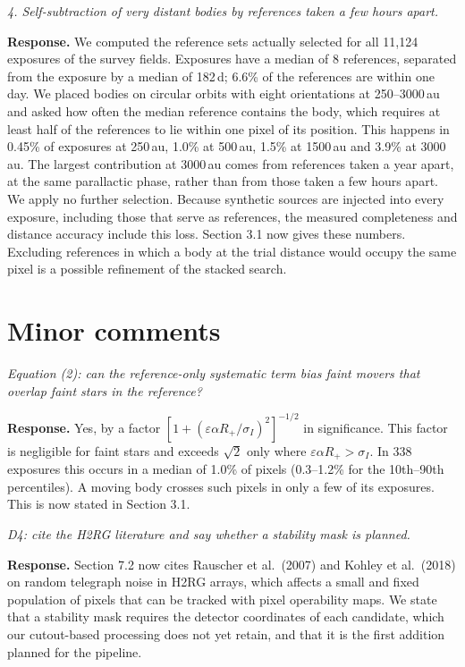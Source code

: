 \documentclass[11pt]{article}
\newenvironment{referee}{\par\color{black!60}\itshape}{\par}
\newcommand{\resp}{\par\noindent\textbf{Response.} }
\begin{document}
\begin{referee}
4. Self-subtraction of very distant bodies by references taken a few hours apart.
\end{referee}
\resp We computed the reference sets actually selected for all 11{,}124 exposures of the survey fields. Exposures have a median of 8 references, separated from the exposure by a median of 182\,d; 6.6\% of the references are within one day. We placed bodies on circular orbits with eight orientations at 250--3000\,au and asked how often the median reference contains the body, which requires at least half of the references to lie within one pixel of its position. This happens in 0.45\% of exposures at 250\,au, 1.0\% at 500\,au, 1.5\% at 1500\,au and 3.9\% at 3000\,au. The largest contribution at 3000\,au comes from references taken a year apart, at the same parallactic phase, rather than from those taken a few hours apart. We apply no further selection. Because synthetic sources are injected into every exposure, including those that serve as references, the measured completeness and distance accuracy include this loss. Section 3.1 now gives these numbers. Excluding references in which a body at the trial distance would occupy the same pixel is a possible refinement of the stacked search.

\section*{Minor comments}

\begin{referee}
Equation (2): can the reference-only systematic term bias faint movers that overlap faint stars in the reference?
\end{referee}
\resp Yes, by a factor $[1 + (\varepsilon\alpha R_+/\sigma_I)^2]^{-1/2}$ in significance. This factor is negligible for faint stars and exceeds $\sqrt{2}$ only where $\varepsilon\alpha R_+ > \sigma_I$. In 338 exposures this occurs in a median of 1.0\% of pixels (0.3--1.2\% for the 10th--90th percentiles). A moving body crosses such pixels in only a few of its exposures. This is now stated in Section 3.1.

\begin{referee}
D4: cite the H2RG literature and say whether a stability mask is planned.
\end{referee}
\resp Section 7.2 now cites Rauscher et al.\ (2007) and Kohley et al.\ (2018) on random telegraph noise in H2RG arrays, which affects a small and fixed population of pixels that can be tracked with pixel operability maps. We state that a stability mask requires the detector coordinates of each candidate, which our cutout-based processing does not yet retain, and that it is the first addition planned for the pipeline.
\end{document}
